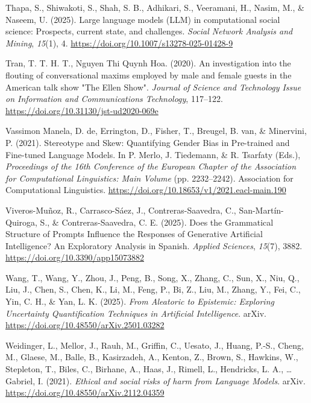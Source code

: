 \documentclass[
  12pt,
]{article}
\newlength{\cslhangindent}
\newenvironment{CSLReferences}[2] %
 {\begin{list}{}{%
  \setlength{\itemindent}{0pt}
  \setlength{\leftmargin}{0pt}
  \setlength{\parsep}{0pt}
  \ifodd #1
   \setlength{\leftmargin}{\cslhangindent}
   \setlength{\itemindent}{-1\cslhangindent}
  \fi
  \setlength{\itemsep}{#2\baselineskip}}}
 {\end{list}}
\begin{document}
\begin{CSLReferences}{1}{0}
Thapa, S., Shiwakoti, S., Shah, S. B., Adhikari, S., Veeramani, H., Nasim, M., \& Naseem, U. (2025). Large language models ({LLM}) in computational social science: Prospects, current state, and challenges. \emph{Social Network Analysis and Mining}, \emph{15}(1), 4. \url{https://doi.org/10.1007/s13278-025-01428-9}

Tran, T. T. H. T., Nguyen Thi Quynh Hoa. (2020). An investigation into the flouting of conversational maxims employed by male and female guests in the {American} talk show "{The} {Ellen} {Show}". \emph{Journal of Science and Technology Issue on Information and Communications Technology}, 117--122. \url{https://doi.org/10.31130/jst-ud2020-069e}

Vassimon Manela, D. de, Errington, D., Fisher, T., Breugel, B. van, \& Minervini, P. (2021). Stereotype and {Skew}: {Quantifying} {Gender} {Bias} in {Pre}-trained and {Fine}-tuned {Language} {Models}. In P. Merlo, J. Tiedemann, \& R. Tsarfaty (Eds.), \emph{Proceedings of the 16th {Conference} of the {European} {Chapter} of the {Association} for {Computational} {Linguistics}: {Main} {Volume}} (pp. 2232--2242). Association for Computational Linguistics. \url{https://doi.org/10.18653/v1/2021.eacl-main.190}

Viveros-Muñoz, R., Carrasco-Sáez, J., Contreras-Saavedra, C., San-Martín-Quiroga, S., \& Contreras-Saavedra, C. E. (2025). Does the {Grammatical} {Structure} of {Prompts} {Influence} the {Responses} of {Generative} {Artificial} {Intelligence}? {An} {Exploratory} {Analysis} in {Spanish}. \emph{Applied Sciences}, \emph{15}(7), 3882. \url{https://doi.org/10.3390/app15073882}

Wang, T., Wang, Y., Zhou, J., Peng, B., Song, X., Zhang, C., Sun, X., Niu, Q., Liu, J., Chen, S., Chen, K., Li, M., Feng, P., Bi, Z., Liu, M., Zhang, Y., Fei, C., Yin, C. H., \& Yan, L. K. (2025). \emph{From {Aleatoric} to {Epistemic}: {Exploring} {Uncertainty} {Quantification} {Techniques} in {Artificial} {Intelligence}}. arXiv. \url{https://doi.org/10.48550/arXiv.2501.03282}

Weidinger, L., Mellor, J., Rauh, M., Griffin, C., Uesato, J., Huang, P.-S., Cheng, M., Glaese, M., Balle, B., Kasirzadeh, A., Kenton, Z., Brown, S., Hawkins, W., Stepleton, T., Biles, C., Birhane, A., Haas, J., Rimell, L., Hendricks, L. A., \ldots{} Gabriel, I. (2021). \emph{Ethical and social risks of harm from {Language} {Models}}. arXiv. \url{https://doi.org/10.48550/arXiv.2112.04359}


\end{CSLReferences}
\end{document}
